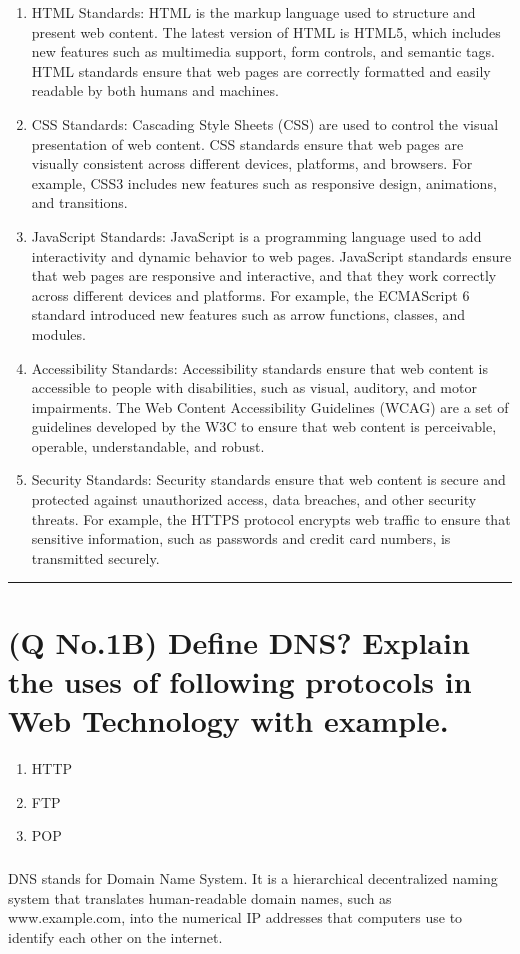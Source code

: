 \documentclass[11pt]{article}
\begin{document}
\begin{enumerate}
    \item HTML Standards: HTML is the markup language used to structure and present web content. The latest version of HTML is HTML5, which includes new features such as multimedia support, form controls, and semantic tags. HTML standards ensure that web pages are correctly formatted and easily readable by both humans and machines.

    \item CSS Standards: Cascading Style Sheets (CSS) are used to control the visual presentation of web content. CSS standards ensure that web pages are visually consistent across different devices, platforms, and browsers. For example, CSS3 includes new features such as responsive design, animations, and transitions.
    
    \item JavaScript Standards: JavaScript is a programming language used to add interactivity and dynamic behavior to web pages. JavaScript standards ensure that web pages are responsive and interactive, and that they work correctly across different devices and platforms. For example, the ECMAScript 6 standard introduced new features such as arrow functions, classes, and modules.
    
    \item Accessibility Standards: Accessibility standards ensure that web content is accessible to people with disabilities, such as visual, auditory, and motor impairments. The Web Content Accessibility Guidelines (WCAG) are a set of guidelines developed by the W3C to ensure that web content is perceivable, operable, understandable, and robust.
    
    \item Security Standards: Security standards ensure that web content is secure and protected against unauthorized access, data breaches, and other security threats. For example, the HTTPS protocol encrypts web traffic to ensure that sensitive information, such as passwords and credit card numbers, is transmitted securely.
\end{enumerate}


\noindent\rule{\linewidth}{0.4pt}
\section{(Q No.1B) Define DNS? Explain the uses of following protocols in Web Technology with example.}
\begin{enumerate}
    \item HTTP
    \item FTP
    \item POP
\end{enumerate}
\subparagraph{}
DNS stands for Domain Name System. It is a hierarchical decentralized naming system that translates human-readable domain names, such as www.example.com, into the numerical IP addresses that computers use to identify each other on the internet.
\end{document}
